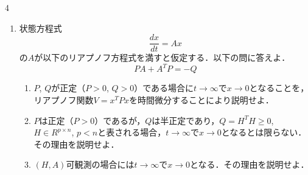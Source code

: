 \documentclass[fleqn]{article}
\begin{document}
\begin{multicols}{4}
\begin{enumerate}
\item
状態方程式
\[
	\frac{dx}{dt}= Ax
\]
の$A$が以下のリアプノフ方程式を満すと仮定する．以下の問に答えよ．
\[
	PA + A^T P = -Q
\]
\begin{enumerate}
\item 
$P$, $Q$が正定（$P>0$, $Q>0$）である場合に$t \rightarrow \infty$で$x \rightarrow 0$となることを，リアプノフ関数$V=x^T P x$を時間微分することにより説明せよ．
\vspace{9cm}

\item
$P$は正定（$P>0$）であるが，$Q$は半正定であり，$Q=H^T H \geq 0$, $H \in R^{p \times n}$, $p < n$と表される場合，$t \rightarrow \infty$で$x \rightarrow 0$となるとは限らない．その理由を説明せよ．
\vspace{6cm}

\item
$(H,A)$可観測の場合には$t \rightarrow \infty$で$x \rightarrow 0$となる．その理由を説明せよ．
\end{enumerate}


\end{enumerate}
\end{multicols}
\end{document}
